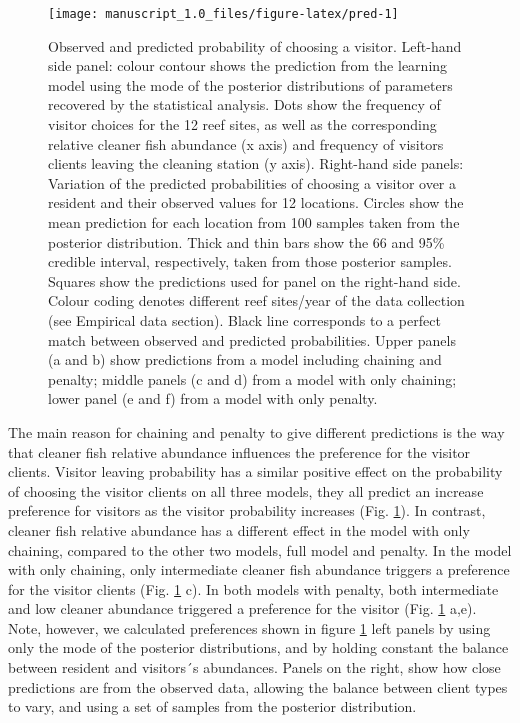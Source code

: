 \documentclass[]{rsos}%
\begin{document}
\begin{figure}

{\centering \texttt{[image: manuscript\_1.0\_files/figure-latex/pred-1]} 

}

\caption{Observed and predicted probability of choosing a visitor.
Left-hand side panel: colour contour shows the prediction from the
learning model using the mode of the posterior distributions of parameters
recovered by the statistical analysis. Dots show the frequency of visitor
choices for the 12 reef sites, as well as the corresponding relative
cleaner fish abundance (x axis) and frequency of visitors clients leaving
the cleaning station (y axis). Right-hand side panels: Variation of the
predicted probabilities of choosing a visitor over a resident and their
observed values for 12 locations. Circles show the mean prediction for
each location from 100 samples taken from the posterior distribution.
Thick and thin bars show the 66 and 95\% credible interval, respectively,
taken from those posterior samples. Squares show the predictions used for
panel on the right-hand side. Colour coding denotes different reef sites/year
of the data collection (see Empirical data section). Black line corresponds
to a perfect match between observed and predicted probabilities. Upper
panels (a and b) show predictions from a model including chaining and
penalty; middle panels (c and d) from a model with only chaining; lower
panel (e and f) from a model with only penalty.}\label{fig:pred}
\end{figure}

The main reason for chaining and penalty to give different
predictions is the way that cleaner fish relative abundance influences the
preference for the visitor clients. Visitor leaving probability has a
similar positive effect on the probability of choosing the visitor
clients on all three models, they all predict an increase preference
for visitors as the visitor probability increases (Fig. \ref{fig:pred}).
In contrast, cleaner fish relative abundance has a different effect in the
model with only chaining, compared to the other two models,
full model and penalty. In the model with only chaining, only intermediate
cleaner fish abundance triggers a preference for the visitor
clients (Fig. \ref{fig:pred} c). In both models with penalty,
both intermediate and low cleaner abundance triggered a preference
for the visitor (Fig. \ref{fig:pred} a,e). Note, however, we calculated
preferences shown in figure \ref{fig:pred} left panels by using only the mode
of the posterior distributions, and by holding constant the balance between
resident and visitors´s abundances. Panels on the right, show how close
predictions are from the observed data, allowing the balance between
client types to vary, and using a set of samples from the posterior
distribution.
\end{document}
